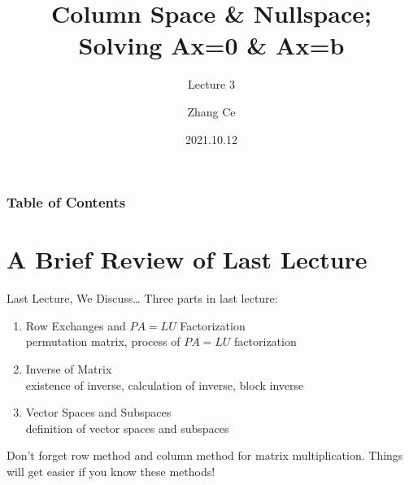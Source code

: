 \documentclass{beamer}
\title[Linear Algebra] %
{Column Space \& Nullspace; Solving Ax=0 \& Ax=b}
\subtitle{Lecture 3}
\author[11910803@mail.sustech.edu.cn] %
{
    Zhang Ce
}
\institute[] %
{
    Department of Electrical and Electronic Engineering\\
    Southern University of Science and Technology
}
\date[2021.10.12] %
{2021.10.12}
\begin{document}
\frame{\titlepage}


\begin{frame}
\frametitle{Table of Contents}
\tableofcontents
\end{frame}
\section{A Brief Review of Last Lecture}
\begin{frame}{Last Lecture, We Discuss\dots}
Three parts in last lecture:
    \begin{enumerate}
        \item Row Exchanges and $PA=LU$ Factorization\\
        permutation matrix, process of $PA=LU$ factorization
        \item Inverse of Matrix\\
        existence of inverse, calculation of inverse, block inverse
        \item Vector Spaces and Subspaces\\
        definition of vector spaces and subspaces
    \end{enumerate}

Don't forget row method and column method for matrix multiplication. Things will get easier if you know these methods!
\end{frame}
\end{document}
